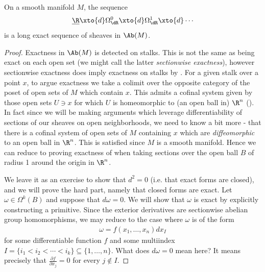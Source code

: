 \documentclass[11pt]{amsart}
\begin{document}
\begin{lemma} 
\label{lem:Poincare-lemma}
On a smooth manifold $M$, the sequence
\begin{equation}\label{eqn:de-Rham-sequence}
\begin{aligned}
    \underline{\R} \xto{d} \Omega^0_\dR \xto{d} \Omega^1_\dR \xto{d} \cdots
\end{aligned}
\end{equation}
is a long exact sequence of sheaves in $\Ab(M)$.
\end{lemma}
\begin{proof} Exactness in $\Ab(M)$ is detected on stalks. This is not the same as being exact on each open set (we might call the latter \emph{sectionwise exactness}), however sectionwise exactness does imply exactness on stalks by . For a given stalk over a point $x$, to argue exactness we take a colimit over the opposite category of the poset of open sets of $M$ which contain $x$. This admits a cofinal system given by those open sets $U\ni x$ for which $U$ is homeomorphic to (an open ball in) $\R^n$ (). In fact since we will be making arguments which leverage differentiability of sections of our sheaves on open neighborhoods, we need to know a bit more - that there is a cofinal system of open sets of $M$ containing $x$ which are \emph{diffeomorphic} to an open ball in $\R^n$. This is satisfied since $M$ is a smooth manifold. Hence we can reduce to proving exactness of  when taking sections over the open ball $B$ of radius 1 around the origin in $\R^n$.


We leave it as an exercise to show that $d^2 = 0$ (i.e. that exact forms are closed), and we will prove the hard part, namely that closed forms are exact. Let $\omega \in \Omega^k(B)$ and suppose that $d\omega = 0$. We will show that $\omega$ is exact by explicitly constructing a primitive. Since the exterior derivatives are sectionwise abelian group homomorphisms, we may reduce to the case where $\omega$ is of the form
\begin{align*}
    \omega = f(x_1, \ldots, x_n) dx_I
\end{align*}
for some differentiable function $f$ and some multiindex $I = \{i_1 < i_2 < \cdots < i_k\} \subseteq \{1, \ldots, n\}$. What does $d\omega = 0$ mean here? It means precisely that $\frac{\partial f}{\partial x_j} = 0$ for every $j\notin I$.


\end{proof}
\end{document}
